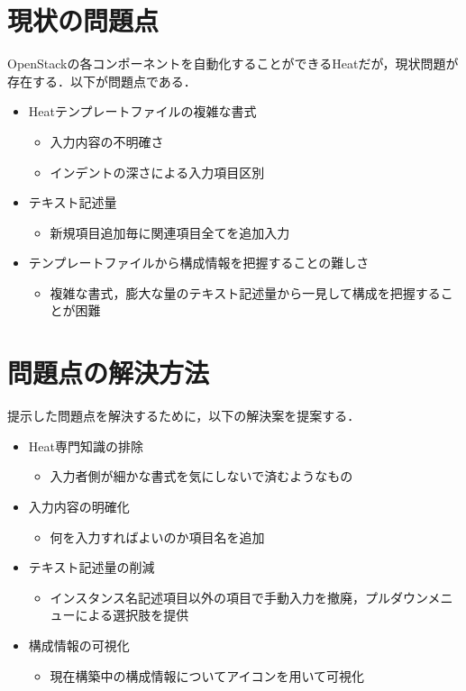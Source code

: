 \documentclass[mingoth]{kut-paper}		%
\begin{document}
	\section{現状の問題点}
	OpenStackの各コンポーネントを自動化することができるHeatだが，現状問題が存在する．以下が問題点である．
	\begin{itemize}
		\item Heatテンプレートファイルの複雑な書式
		\begin{itemize}
			\item 入力内容の不明確さ
			\item インデントの深さによる入力項目区別
		\end{itemize}
		\item テキスト記述量
		\begin{itemize}
			\item 新規項目追加毎に関連項目全てを追加入力
		\end{itemize}
		\item テンプレートファイルから構成情報を把握することの難しさ
		\begin{itemize}
			\item 複雑な書式，膨大な量のテキスト記述量から一見して構成を把握することが困難
		\end{itemize}
	\end{itemize}
	\section{問題点の解決方法}
	提示した問題点を解決するために，以下の解決案を提案する．
	\begin{itemize}
		\item Heat専門知識の排除
		\begin{itemize}
			\item 入力者側が細かな書式を気にしないで済むようなもの
		\end{itemize}
		\item 入力内容の明確化
		\begin{itemize}
			\item 何を入力すればよいのか項目名を追加
		\end{itemize}
		\item テキスト記述量の削減
		\begin{itemize}
			\item インスタンス名記述項目以外の項目で手動入力を撤廃，プルダウンメニューによる選択肢を提供
		\end{itemize}
		\item 構成情報の可視化
		\begin{itemize}
			\item 現在構築中の構成情報についてアイコンを用いて可視化
		\end{itemize}
	\end{itemize}
	
\end{document}
